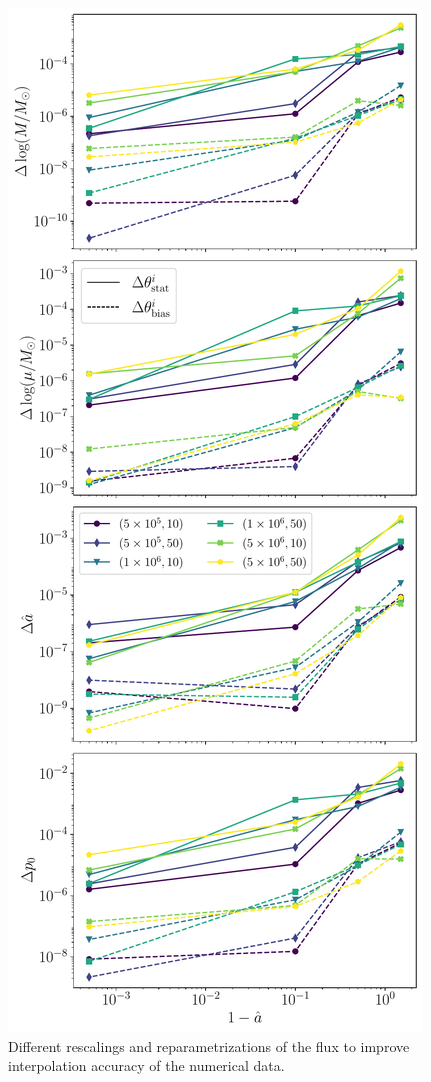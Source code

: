 \documentclass[%
 reprint,
 nofootinbib,
 amsmath,amssymb,
 aps,
 prd,
]{revtex4-2}
\begin{document}
\begin{figure}[!htp]
    \centering
    \includegraphics[width=0.98\linewidth]{figures/phase_error.pdf}
    \caption{Different rescalings and reparametrizations of the flux to improve interpolation accuracy of the numerical data.}
    \label{fig:fisherCompare}
\end{figure}
\end{document}
